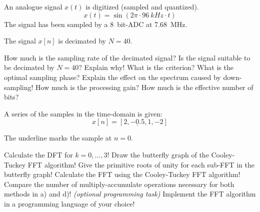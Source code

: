 \begin{question}[subtitle={Down-sampling}]
	An analogue signal $x(t)$ is digitized (sampled and quantized).
	\begin{equation*}
		x(t) = \sin\left(2 \pi \cdot \SI{96}{kHz} \cdot t\right)
	\end{equation*}
	The signal has been sampled by a \SI{8}{bit}-ADC at \SI{7.68}{MHz}.
	
	The signal $x[n]$ is decimated by $N = 40$.
	
	\begin{tasks}
		\task
		How much is the sampling rate of the decimated signal?
		\task
		Is the signal suitable to be decimated by $N = 40$? Explain why! What is the criterion?
		\task
		What is the optimal sampling phase?
		\task
		Explain the effect on the spectrum caused by down-sampling!
		\task
		How much is the processing gain? How much is the effective number of bits?
	\end{tasks}
\end{question}

\begin{solution}
	\begin{tasks}
	\end{tasks}
\end{solution}


\begin{question}[subtitle={FFT}]
	A series of the samples in the time-domain is given:
	\begin{equation*}
		x[n] = \left[2, \underline{-0.5}, 1, -2 \right]
	\end{equation*}
	
	\begin{remark}
		The underline marks the sample at $n = 0$.
	\end{remark}
	
	\begin{tasks}
		\task
		Calculate the DFT for $k = 0, \ldots, 3$!
		\task
		Draw the butterfly graph of the Cooley-Tuckey FFT algorithm!
		\task
		Give the primitive roots of unity for each sub-FFT in the butterfly graph!
		\task
		Calculate the FFT using the Cooley-Tuckey FFT algorithm!
		\task
		Compare the number of multiply-accumulate operations necessary for both methods in a) and d)!
		\task
		\textit{(optional programming task)} Implement the FFT algorithm in a programming language of your choice!
	\end{tasks}
\end{question}

